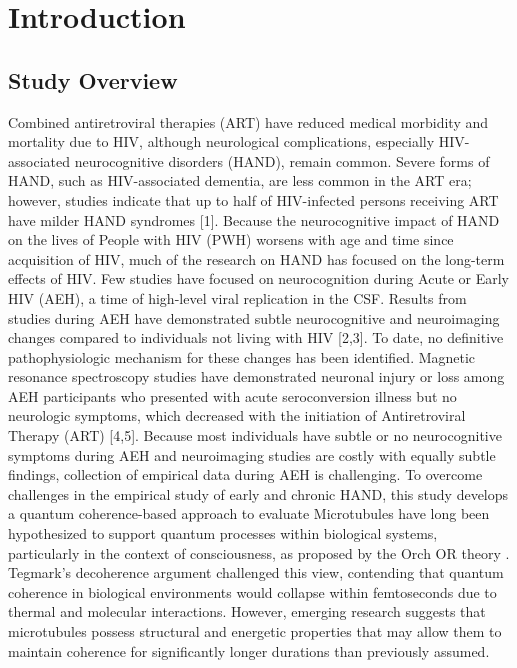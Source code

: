 \section{Introduction}
\subsection{Study Overview}
Combined antiretroviral therapies (ART) have reduced medical morbidity and mortality due to HIV, although neurological complications, especially HIV-associated neurocognitive disorders (HAND), remain common. Severe forms of HAND, such as HIV-associated dementia, are less common in the ART era; however, studies indicate that up to half of HIV-infected persons receiving ART have milder HAND syndromes [1]. Because the neurocognitive impact of HAND on the lives of People with HIV (PWH) worsens with age and time since acquisition of HIV, much of the research on HAND has focused on the long-term effects of HIV. Few studies have focused on neurocognition during Acute or Early HIV (AEH), a time of high-level viral replication in the CSF. Results from studies during AEH have demonstrated subtle neurocognitive and neuroimaging changes compared to individuals not living with HIV [2,3]. To date, no definitive pathophysiologic mechanism for these changes has been identified. Magnetic resonance spectroscopy studies have demonstrated neuronal injury or loss among AEH participants who presented with acute seroconversion illness but no neurologic symptoms, which decreased with the initiation of Antiretroviral Therapy (ART) [4,5]. Because most individuals have subtle or no neurocognitive symptoms during AEH and neuroimaging studies are costly with equally subtle findings, collection of empirical data during AEH is challenging.
To overcome challenges in the empirical study of early and chronic HAND, this study develops a quantum coherence-based approach to evaluate Microtubules have long been hypothesized to support quantum processes within biological systems, particularly in the context of consciousness, as proposed by the Orch OR theory \cite{hameroff_orchestrated_1996,nanopoulos_quantum_1995}. Tegmark's decoherence argument \cite{tegmark_importance_2000} challenged this view, contending that quantum coherence in biological environments would collapse within femtoseconds due to thermal and molecular interactions. However, emerging research suggests that microtubules possess structural and energetic properties that may allow them to maintain coherence for significantly longer durations than previously assumed.

